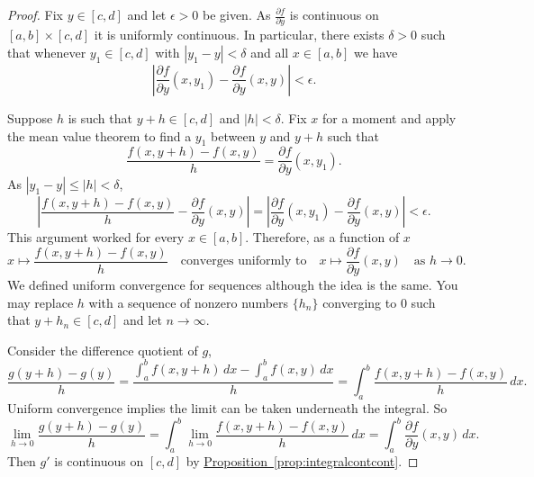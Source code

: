 \documentclass[12pt,openany]{book}
\newcommand{\abs}[1]{\left\lvert {#1} \right\rvert}
\theoremstyle{plain}
\theoremstyle{remark}
\theoremstyle{definition}
\theoremstyle{exercise}
\theoremstyle{example}
\newcommand{\propref}[1]{\hyperref[#1]{Proposition~\ref*{#1}}}
\begin{document}
\begin{proof}
Fix $y \in [c,d]$ and let $\epsilon > 0$ be given.
As $\frac{\partial f}{\partial y}$ is continuous on $[a,b] \times [c,d]$ it
is uniformly continuous.  In particular, there exists $\delta > 0$ such that
whenever $y_1 \in [c,d]$ with
$\abs{y_1-y} < \delta$ and all $x \in [a,b]$ we have
\begin{equation*}
\abs{\frac{\partial f}{\partial y}(x,y_1)-\frac{\partial f}{\partial y}(x,y)} < \epsilon .
\end{equation*}

Suppose $h$ is such that $y+h \in [c,d]$ and $\abs{h} < \delta$.
Fix $x$ for a moment
and apply the mean value theorem to find a $y_1$ between $y$ and $y+h$ such that
\begin{equation*}
\frac{f(x,y+h)-f(x,y)}{h}
=
\frac{\partial f}{\partial y}(x,y_1) .
\end{equation*}
As $\abs{y_1-y} \leq \abs{h} < \delta$,
\begin{equation*}
\abs{
\frac{f(x,y+h)-f(x,y)}{h}
-
\frac{\partial f}{\partial y}(x,y) 
}
=
\abs{
\frac{\partial f}{\partial y}(x,y_1) 
-
\frac{\partial f}{\partial y}(x,y) 
}
< \epsilon .
\end{equation*}
This argument worked for every $x \in [a,b]$.  Therefore, as a function of
$x$
\begin{equation*}
x \mapsto \frac{f(x,y+h)-f(x,y)}{h}
\quad
\text{converges uniformly to}
\quad
x \mapsto \frac{\partial f}{\partial y}(x,y)
\quad
\text{as } h \to 0 .
\end{equation*}
We defined uniform convergence for sequences although the idea is the
same.  You may replace $h$ with a sequence of nonzero 
numbers $\{ h_n \}$
converging to $0$ such that $y+h_n \in [c,d]$ and let $n \to \infty$.

Consider the difference quotient of $g$,
\begin{equation*}
\frac{g(y+h)-g(y)}{h}
=
\frac{\int_a^b f(x,y+h) \,dx -
\int_a^b f(x,y) \,dx }{h}
=
\int_a^b \frac{f(x,y+h)-f(x,y)}{h} \,dx .
\end{equation*}
Uniform convergence implies the limit can be taken underneath the integral.
So
\begin{equation*}
\lim_{h\to 0}
\frac{g(y+h)-g(y)}{h}
= 
\int_a^b 
\lim_{h\to 0}
\frac{f(x,y+h)-f(x,y)}{h} \,dx 
=
\int_a^b 
\frac{\partial f}{\partial y}(x,y) \,dx .
\end{equation*}
Then $g'$ is continuous on $[c,d]$ by
\propref{prop:integralcontcont}.
\end{proof}
\end{document}
